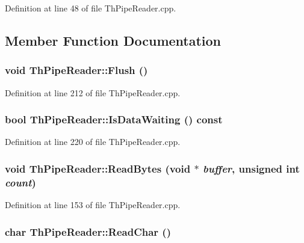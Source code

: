 Definition at line 48 of file ThPipeReader.cpp.

\subsection{Member Function Documentation}
\hypertarget{class_th_pipe_reader_6bd170ad2cc37227e1cec282c7ea64a0}{
\subsubsection[{Flush}]{\setlength{\rightskip}{0pt plus 5cm}void ThPipeReader::Flush ()}}
\label{class_th_pipe_reader_6bd170ad2cc37227e1cec282c7ea64a0}




Definition at line 212 of file ThPipeReader.cpp.\hypertarget{class_th_pipe_reader_507edd4133881b06ac555f2991c0a665}{
\subsubsection[{IsDataWaiting}]{\setlength{\rightskip}{0pt plus 5cm}bool ThPipeReader::IsDataWaiting () const}}
\label{class_th_pipe_reader_507edd4133881b06ac555f2991c0a665}




Definition at line 220 of file ThPipeReader.cpp.\hypertarget{class_th_pipe_reader_ec4e943c71ffb3f29b07129fb2285cac}{
\subsubsection[{ReadBytes}]{\setlength{\rightskip}{0pt plus 5cm}void ThPipeReader::ReadBytes (void $\ast$ {\em buffer}, \/  unsigned int {\em count})}}
\label{class_th_pipe_reader_ec4e943c71ffb3f29b07129fb2285cac}




Definition at line 153 of file ThPipeReader.cpp.\hypertarget{class_th_pipe_reader_bfd9f2de05e08aac9281789a1de3ae26}{
\subsubsection[{ReadChar}]{\setlength{\rightskip}{0pt plus 5cm}char ThPipeReader::ReadChar ()}}
\label{class_th_pipe_reader_bfd9f2de05e08aac9281789a1de3ae26}




